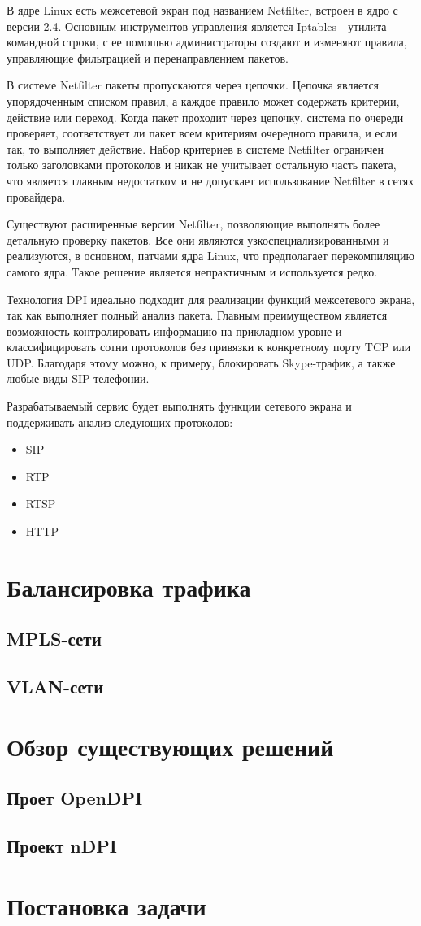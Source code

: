 В ядре Linux есть межсетевой экран под названием Netfilter, встроен в ядро с версии 2.4. Основным инструментов управления является Iptables - утилита командной строки, с ее помощью администраторы создают и изменяют правила, управляющие фильтрацией и перенаправлением пакетов.

В системе Netfilter пакеты пропускаются через цепочки. Цепочка является упорядоченным списком правил, а каждое правило может содержать критерии, действие или переход. Когда пакет проходит через цепочку, система по очереди проверяет, соответствует ли пакет всем критериям очередного правила, и если так, то выполняет действие. Набор критериев в системе Netfilter ограничен только заголовками протоколов и никак не учитывает остальную часть пакета, что является главным недостатком и не допускает использование Netfilter в сетях провайдера.

Существуют расширенные версии Netfilter, позволяющие выполнять более детальную проверку пакетов. Все они являются узкоспециализированными и реализуются, в основном, патчами ядра Linux, что предполагает перекомпиляцию самого ядра. Такое решение является непрактичным и используется редко.

Технология DPI идеально подходит для реализации функций межсетевого экрана, так как выполняет полный анализ пакета. Главным преимуществом является возможность контролировать информацию на прикладном уровне и классифицировать сотни протоколов без привязки к конкретному порту TCP или UDP. Благодаря этому можно, к примеру, блокировать Skype-трафик, а также любые виды SIP-телефонии.

Разрабатываемый сервис будет выполнять функции сетевого экрана и поддерживать анализ следующих протоколов:
\begin{itemize}
\item SIP
\item RTP
\item RTSP
\item HTTP
\end{itemize}


\section{Балансировка трафика}

\subsection{MPLS-сети}

\subsection{VLAN-сети}


\section{Обзор существующих решений}

\subsection{Проет OpenDPI}

\subsection{Проект nDPI}

\section{Постановка задачи}

